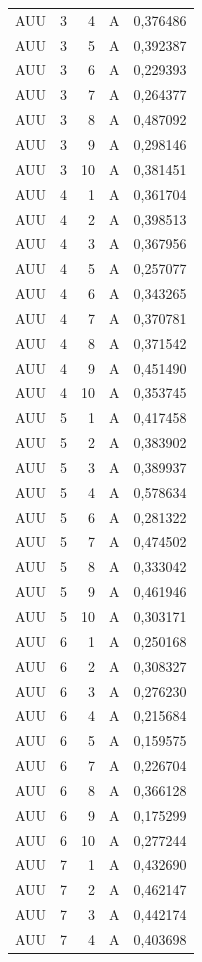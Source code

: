 \begin{longtable}{lrrrr}
AUU & 3 & 4 & A & 0,376486 \\
AUU & 3 & 5 & A & 0,392387 \\
AUU & 3 & 6 & A & 0,229393 \\
AUU & 3 & 7 & A & 0,264377 \\
AUU & 3 & 8 & A & 0,487092 \\
AUU & 3 & 9 & A & 0,298146 \\
AUU & 3 & 10 & A & 0,381451 \\
AUU & 4 & 1 & A & 0,361704 \\
AUU & 4 & 2 & A & 0,398513 \\
AUU & 4 & 3 & A & 0,367956 \\
AUU & 4 & 5 & A & 0,257077 \\
AUU & 4 & 6 & A & 0,343265 \\
AUU & 4 & 7 & A & 0,370781 \\
AUU & 4 & 8 & A & 0,371542 \\
AUU & 4 & 9 & A & 0,451490 \\
AUU & 4 & 10 & A & 0,353745 \\
AUU & 5 & 1 & A & 0,417458 \\
AUU & 5 & 2 & A & 0,383902 \\
AUU & 5 & 3 & A & 0,389937 \\
AUU & 5 & 4 & A & 0,578634 \\
AUU & 5 & 6 & A & 0,281322 \\
AUU & 5 & 7 & A & 0,474502 \\
AUU & 5 & 8 & A & 0,333042 \\
AUU & 5 & 9 & A & 0,461946 \\
AUU & 5 & 10 & A & 0,303171 \\
AUU & 6 & 1 & A & 0,250168 \\
AUU & 6 & 2 & A & 0,308327 \\
AUU & 6 & 3 & A & 0,276230 \\
AUU & 6 & 4 & A & 0,215684 \\
AUU & 6 & 5 & A & 0,159575 \\
AUU & 6 & 7 & A & 0,226704 \\
AUU & 6 & 8 & A & 0,366128 \\
AUU & 6 & 9 & A & 0,175299 \\
AUU & 6 & 10 & A & 0,277244 \\
AUU & 7 & 1 & A & 0,432690 \\
AUU & 7 & 2 & A & 0,462147 \\
AUU & 7 & 3 & A & 0,442174 \\
AUU & 7 & 4 & A & 0,403698 \\

\end{longtable}
